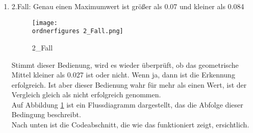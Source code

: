 \begin{enumerate}
\begin{itemize}
\begin{enumerate}
\begin{enumerate}
			Sind 2 oder mehrere Maximumwerte größer als 0.06, wird das geometrische Mittel beobachtet. Ist das größer als 0.01, stimmt die Erkennung nicht. Wenn weniger als 2 Werte größer als 0.06 sind, muss auch das geometrische Mittel kleiner als 0.027 sein, um eine erfolgreiche Erkennung zu haben. \\
			
			Auf Abbildung \ref{fig:1_Fall} ist ein Flussdiagramm dargestellt, das die Abfolge dieser Bedingung beschreibt.\\
			
			Nach unten ist die Codeabschnitt, die wie das funktioniert zeigt, ersichtlich.\\
			
\begin{lstlisting}
global count
count = 0
for i in range(0,len(MAX)):
	if MAX[i] > 0.06:
		count+=1
		status1=True
		status11=True
		status2=True
		status22=True
				
#Wenn JA: Nur wenn gmT kleiner als 0.01 sind sie richtig,
 sonst FALSCH
	if count ==1:
		global status11
		status11=False
	if count >= 2:
		global status22
	status22=False
	if gmT > 0.01:
	global status1
	status1 = False
				
#Wenn NEIN: gmT muss kleiner als 0.027 sein,
			um RICHTIG zu sein
	else:
		if gmT > 0.027:
			global status2
			status2 = False
\end{lstlisting}
	
			
			\item 2.Fall: Genau einen Maximumwert ist größer als 0.07 und kleiner als 0.084 \\
			
				\begin{figure}[H]
				\centering
				\texttt{[image: \\ordnerfigures 2\_Fall.png]}
				\caption{2\_Fall}
				\label{fig:2_Fall}
			\end{figure}
			
			Stimmt dieser Bedienung, wird es wieder überprüft, ob das geometrische Mittel kleiner als 0.027 ist oder nicht. Wenn ja, dann ist die Erkennung erfolgreich. Ist aber dieser Bedienung wahr für mehr als einen Wert, ist der Vergleich gleich als nicht erfolgreich genommen. \\
			
			Auf Abbildung \ref{fig:2_Fall} ist ein Flussdiagramm dargestellt, das die Abfolge dieser Bedingung beschreibt.\\
			
			Nach unten ist die Codeabschnitt, die wie das funktioniert zeigt, ersichtlich.\\
			

\end{enumerate}
\end{enumerate}
\end{itemize}
\end{enumerate}
